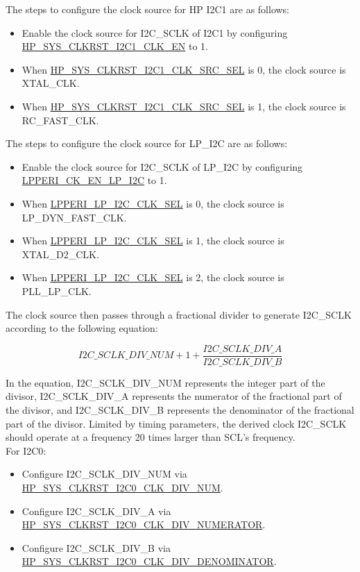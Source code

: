 \documentclass[main\_\_EN.tex]{subfiles}
\begin{document}
The steps to configure the clock source for HP I2C1 are as follows:
\begin{itemize}
    \item Enable the clock source for I2C\_SCLK of I2C1 by configuring \hyperref[fielddesc:HPSYSCLKRSTI2C1CLKEN]{HP\_SYS\_CLKRST\_I2C1\_CLK\_EN} to 1.
    \item When \hyperref[fielddesc:HPSYSCLKRSTI2C1CLKSRCSEL]{HP\_SYS\_CLKRST\_I2C1\_CLK\_SRC\_SEL} is 0, the clock source is XTAL\_CLK.
    \item When \hyperref[fielddesc:HPSYSCLKRSTI2C1CLKSRCSEL]{HP\_SYS\_CLKRST\_I2C1\_CLK\_SRC\_SEL} is 1, the clock source is RC\_FAST\_CLK.
\end{itemize}

The steps to configure the clock source for LP\_I2C are as follows:
\begin{itemize}
    \item Enable the clock source for I2C\_SCLK of LP\_I2C by configuring \hyperref[fielddesc:LPPERICKENLPI2C]{LPPERI\_CK\_EN\_LP\_I2C} to 1.
    \item When \hyperref[fielddesc:LPPERILPI2CCLKSEL]{LPPERI\_LP\_I2C\_CLK\_SEL} is 0, the clock source is LP\_DYN\_FAST\_CLK.
    \item When \hyperref[fielddesc:LPPERILPI2CCLKSEL]{LPPERI\_LP\_I2C\_CLK\_SEL} is 1, the clock source is XTAL\_D2\_CLK.
    \item When \hyperref[fielddesc:LPPERILPI2CCLKSEL]{LPPERI\_LP\_I2C\_CLK\_SEL} is 2, the clock source is PLL\_LP\_CLK.
\end{itemize}

The clock source then passes through a fractional divider to generate I2C\_SCLK according to the following equation:

\[I2C\_SCLK\_DIV\_NUM + 1+\frac{ I2C\_SCLK\_DIV\_A}{I2C\_SCLK\_DIV\_B}
\]


In the equation, I2C\_SCLK\_DIV\_NUM represents the integer part of the divisor, I2C\_SCLK\_DIV\_A represents the numerator of the fractional part of the divisor, and I2C\_SCLK\_DIV\_B represents the denominator of the fractional part of the divisor. Limited by timing parameters, the derived clock I2C\_SCLK should operate at a frequency 20 times larger than SCL's frequency.\\

For I2C0:
\begin{itemize}
    \item Configure I2C\_SCLK\_DIV\_NUM via \hyperref[fielddesc:HPSYSCLKRSTI2C0CLKDIVNUM]{HP\_SYS\_CLKRST\_I2C0\_CLK\_DIV\_NUM}.
    \item Configure I2C\_SCLK\_DIV\_A via \hyperref[fielddesc:HPSYSCLKRSTI2C0CLKDIVNUMERATOR]{HP\_SYS\_CLKRST\_I2C0\_CLK\_DIV\_NUMERATOR}.
    \item Configure I2C\_SCLK\_DIV\_B via \hyperref[fielddesc:HPSYSCLKRSTI2C0CLKDIVDENOMINATOR]{HP\_SYS\_CLKRST\_I2C0\_CLK\_DIV\_DENOMINATOR}.
\end{itemize}
\end{document}

